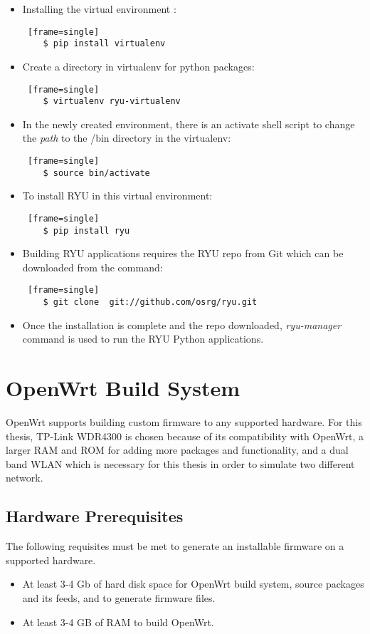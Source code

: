 \begin{itemize}
	\item Installing the virtual environment :
	\begin{lstlisting} [frame=single]
	$ pip install virtualenv
	\end{lstlisting} 
	\item Create a directory in virtualenv for python packages: 
	\begin{lstlisting} [frame=single]
	$ virtualenv ryu-virtualenv
	\end{lstlisting}
	\item In the newly created environment, there is an activate shell script to change the \textit{path} to the /bin directory in the virtualenv: 
	\begin{lstlisting} [frame=single]
	$ source bin/activate
	\end{lstlisting}
	\item To install RYU in this virtual environment:
	\begin{lstlisting} [frame=single]
	$ pip install ryu
	\end{lstlisting}
	\item Building RYU applications requires the RYU repo from Git which can be downloaded from the command:
	\begin{lstlisting} [frame=single]
	$ git clone  git://github.com/osrg/ryu.git
	\end{lstlisting}
	\item Once the installation is complete and the repo downloaded, \textit{ryu-manager} command is used to run the RYU Python applications.
\end{itemize}

\section{OpenWrt Build System \cite{OpenWrt_build_root}} \label{OpenWrt_build}
OpenWrt supports building custom firmware to any supported hardware. For this thesis, TP-Link WDR4300 is chosen because of its compatibility with OpenWrt, a larger RAM and ROM for adding more packages and functionality, and a dual band WLAN which is necessary for this thesis in order to simulate two different network.
\subsection{Hardware Prerequisites}
The following requisites must be met to generate an installable firmware on a supported hardware.
\begin{itemize}
	\item At least 3-4 Gb of hard disk space for OpenWrt build system, source packages and its feeds, and to generate firmware files.
	\item At least 3-4 GB of RAM to build OpenWrt.
\end{itemize}
